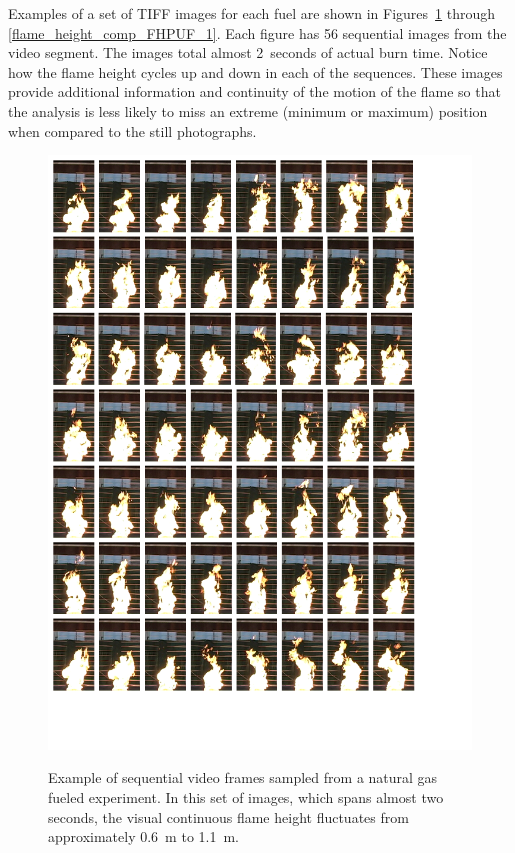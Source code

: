 \documentclass[twoside]{uocthesis}
\begin{document}
{Examples of a set of TIFF images for each fuel are shown in Figures~\ref{flame_height_comp_FHNG80_1} through \ref{flame_height_comp_FHPUF_1}.   Each figure has 56 sequential images from the video segment.  The images total almost 2~seconds of actual burn time.  Notice how the flame height cycles up and down in each of the sequences.  These images provide additional information and continuity of the motion of the flame so that the analysis is less likely to miss an extreme (minimum or maximum) position when compared to the still photographs.

\begin{figure}
	\centering
	\includegraphics[width=\textwidth]{../Figures/flame_height_comp_FHNG80}\\
	\caption[Example of sequential video frames sampled from a natural gas fueled experiment]{Example of sequential video frames sampled from a natural gas fueled experiment.  In this set of images, which spans almost two seconds, the visual continuous flame height fluctuates from approximately 0.6~m to 1.1~m.}
	\label{flame_height_comp_FHNG80_1}
\end{figure}

}
\end{document}
